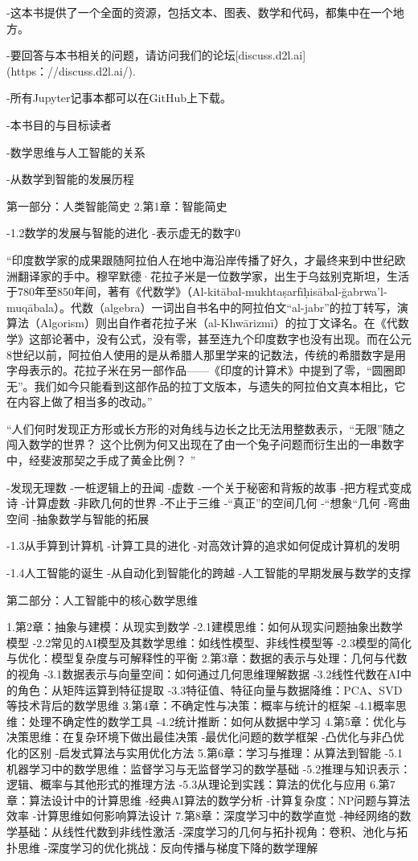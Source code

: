 -这本书提供了一个全面的资源，包括文本、图表、数学和代码，都集中在一个地方。

-要回答与本书相关的问题，请访问我们的论坛[discuss.d2l.ai](https：//discuss.d2l.ai/).

-所有Jupyter记事本都可以在GitHub上下载。



-本书目的与目标读者

-数学思维与人工智能的关系

-从数学到智能的发展历程

    第一部分：人类智能简史
2.第1章：智能简史




-1.2数学的发展与智能的进化
-表示虚无的数字0

“印度数学家的成果跟随阿拉伯人在地中海沿岸传播了好久，才最终来到中世纪欧洲翻译家的手中。穆罕默德·花拉子米是一位数学家，出生于乌兹别克斯坦，生活于780年至850年间，著有《代数学》（Al-kitābal-mukhtaṣarfīḥisābal-ğabrwa’l-muqābala）。代数（algebra）一词出自书名中的阿拉伯文“al-jabr”的拉丁转写，演算法（Algorism）则出自作者花拉子米（al-Khwārizmī）的拉丁文译名。在《代数学》这部论著中，没有公式，没有零，甚至连九个印度数字也没有出现。而在公元8世纪以前，阿拉伯人使用的是从希腊人那里学来的记数法，传统的希腊数字是用字母表示的。花拉子米在另一部作品——《印度的计算术》中提到了零，“圆圈即无”。我们如今只能看到这部作品的拉丁文版本，与遗失的阿拉伯文真本相比，它在内容上做了相当多的改动。”

“人们何时发现正方形或长方形的对角线与边长之比无法用整数表示，“无限”随之闯入数学的世界？
这个比例为何又出现在了由一个兔子问题而衍生出的一串数字中，经斐波那契之手成了黄金比例？
”

-发现无理数
-一桩逻辑上的丑闻
-虚数
-一个关于秘密和背叛的故事
-把方程式变成诗
-计算虚数
-非欧几何的世界
-不止于三维
-“真正”的空间几何
-“想象“几何
-弯曲空间
-抽象数学与智能的拓展

-1.3从手算到计算机
-计算工具的进化
-对高效计算的追求如何促成计算机的发明

-1.4人工智能的诞生
-从自动化到智能化的跨越
-人工智能的早期发展与数学的支撑

    第二部分：人工智能中的核心数学思维

1.第2章：抽象与建模：从现实到数学
-2.1建模思维：如何从现实问题抽象出数学模型
-2.2常见的AI模型及其数学思维：如线性模型、非线性模型等
-2.3模型的简化与优化：模型复杂度与可解释性的平衡
2.第3章：数据的表示与处理：几何与代数的视角
-3.1数据表示与向量空间：如何通过几何思维理解数据
-3.2线性代数在AI中的角色：从矩阵运算到特征提取
-3.3特征值、特征向量与数据降维：PCA、SVD等技术背后的数学思维
3.第4章：不确定性与决策：概率与统计的框架
-4.1概率思维：处理不确定性的数学工具
-4.2统计推断：如何从数据中学习
4.第5章：优化与决策思维：在复杂环境下做出最佳决策
-最优化问题的数学框架
-凸优化与非凸优化的区别
-启发式算法与实用优化方法
5.第6章：学习与推理：从算法到智能
-5.1机器学习中的数学思维：监督学习与无监督学习的数学基础
-5.2推理与知识表示：逻辑、概率与其他形式的推理方法
-5.3从理论到实践：算法的优化与应用
6.第7章：算法设计中的计算思维
-经典AI算法的数学分析
-计算复杂度：NP问题与算法效率
-计算思维如何影响算法设计
7.第8章：深度学习中的数学直觉
-神经网络的数学基础：从线性代数到非线性激活
-深度学习的几何与拓扑视角：卷积、池化与拓扑思维
-深度学习的优化挑战：反向传播与梯度下降的数学理解

